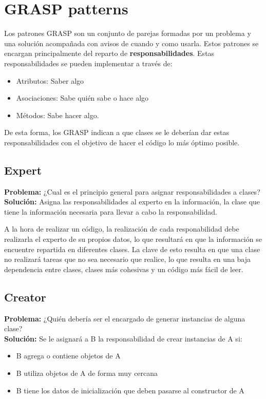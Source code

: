 \documentclass[11pt]{article}
\theoremstyle{plain}
\begin{document}
    \section{GRASP patterns} %
    \label{sec:grasp_patterns}
        Los patrones GRASP son un conjunto de parejas formadas por un problema y una solución acompañada con avisos de cuando y como usarla. Estos patrones se encargan principalmente del reparto de \textbf{responsabilidades}. Estas responsabilidades se pueden implementar a través de:
        \begin{itemize}
            \item Atributos: Saber algo
            \item Asociaciones: Sabe quién sabe o hace algo
            \item Métodos: Sabe hacer algo.
        \end{itemize}
        De esta forma, los GRASP indican a que clases se le deberían dar estas responsabilidades con el objetivo de hacer el código lo más óptimo posible.
        \subsection{Expert} %
        \label{sub:expert}

            \begin{center}
                \textbf{Problema:} ¿Cual es el principio general para asignar responsabilidades a clases?\\
                \textbf{Solución:} Asigna las responsabilidades al experto en la información, la clase que tiene la información necesaria para llevar a cabo la responsabilidad.
            \end{center}
            A la hora de realizar un código, la realización de cada responabilidad debe realizarla el experto de su propios datos, lo que resultará en que la información se encuentre repartida en diferentes clases. La clave de esto resulta en que una clase no realizará tareas que no sea necesario que realice, lo que resulta en una baja dependencia entre clases, clases más cohesivas y un código más fácil de leer.
        \subsection{Creator} %
        \label{sub:creator}
            \begin{center}
                \textbf{Problema:} ¿Quién debería ser el encargado de generar instancias de alguna clase?\\
                \textbf{Solución:} Se le asignará a B la responsabilidad de crear instancias de A si:
                \begin{itemize}
                    \item B agrega o contiene objetos de A
                    \item B utiliza objetos de A de forma muy cercana
                    \item B tiene los datos de inicialización que deben pasarse al constructor de A
                \end{itemize}
            \end{center}
            
\end{document}
